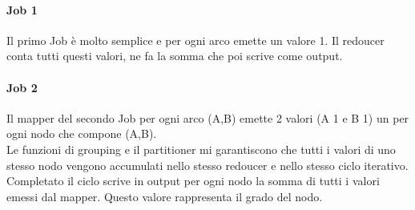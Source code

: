 \documentclass[paper=a4, fontsize=11pt]{scrartcl}	%
\numberwithin{equation}{section}															%
\numberwithin{figure}{section}																%
\numberwithin{table}{section}																%
\begin{document}
\paragraph{Job 1}
Il primo Job è molto semplice e per ogni arco emette un valore 1. Il redoucer conta tutti questi valori, ne fa la somma che poi scrive come output.
\paragraph{Job 2}
Il mapper del secondo Job per ogni arco (A,B) emette 2 valori (A 1 e B 1) un per ogni nodo che compone (A,B).\\
Le funzioni di grouping e il partitioner mi garantiscono che tutti i valori di uno stesso nodo vengono accumulati nello stesso redoucer e nello stesso ciclo iterativo. Completato il ciclo scrive in output per ogni nodo la somma di tutti i valori emessi dal mapper. Questo valore rappresenta il grado del nodo.
\end{document}
